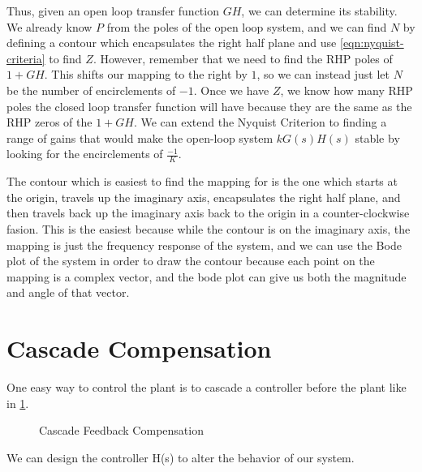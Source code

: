 Thus, given an open loop transfer function $GH$, we can determine its stability.
We already know $P$ from the poles of the open loop system, and we can find $N$ by defining a contour which encapsulates the right half plane and use \cref{eqn:nyquist-criteria} to find $Z$.
However, remember that we need to find the RHP poles of $1+GH$. This shifts our mapping to the right by $1$, so we can instead just let $N$ be the number of encirclements of $-1$.
Once we have $Z$, we know how many RHP poles the closed loop transfer function will have because they are the same as the RHP zeros of the $1+GH$.
We can extend the Nyquist Criterion to finding a range of gains that would make the open-loop system $kG(s)H(s)$ stable by looking for the encirclements of $\frac{-1}{K}$.

The contour which is easiest to find the mapping for is the one which starts at the origin, travels up the imaginary axis, encapsulates the right half plane, and then travels back up the imaginary axis back to the origin in a counter-clockwise fasion.
This is the easiest because while the contour is on the imaginary axis, the mapping is just the frequency response of the system, and we can use the Bode plot of the system in order to draw the contour because each point on the mapping is a complex vector, and the bode plot can give us both the magnitude and angle of that vector.
\section{Cascade Compensation}
One easy way to control the plant is to cascade a controller before the plant like in \cref{fig:cascade-comp}.
\begin{gitbook-image}
\begin{figure}[H]
    \centering 
    \caption{Cascade Feedback Compensation}
    \label{fig:cascade-comp}
\end{figure}
\end{gitbook-image}
We can design the controller H(s) to alter the behavior of our system.
